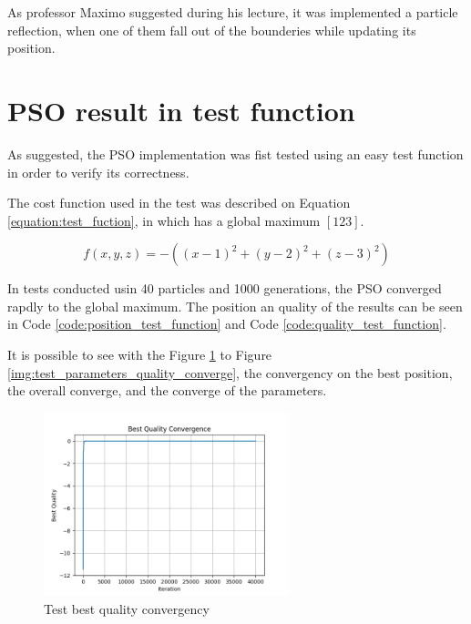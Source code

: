 As professor Maximo suggested during his lecture, it was implemented a particle reflection, when one of them fall out of the bounderies while updating its position.

\section{PSO result in test function}

As suggested, the PSO implementation was fist tested using an easy test function in order to verify its correctness.

The cost function used in the test was described on Equation \ref{equation:test_fuction}, in which has a global maximum $[1 2 3]$.

\begin{equation}
    \label{equation:test_fuction}
    f(x, y, z) = -((x - 1)^2 + (y-2)^2 + (z-3)^2)
\end{equation}

In tests conducted usin 40 particles and 1000 generations, the PSO converged rapdly to the global maximum. The position an quality of the results can be seen in Code \ref{code:position_test_function} and Code \ref{code:quality_test_function}.





It is possible to see with the Figure \ref{img:test_best_quality_converge} to Figure \ref{img:test_parameters_quality_converge}, the convergency on the best position, the overall converge, and the converge of the parameters.

\begin{figure}
  \begin{center}
  \includegraphics[width=2.8in]{./../code/test_function_result/test_best_convergence.png}
  \caption{Test best quality convergency}
  \label{img:test_best_quality_converge}
  \end{center}
\end{figure}

